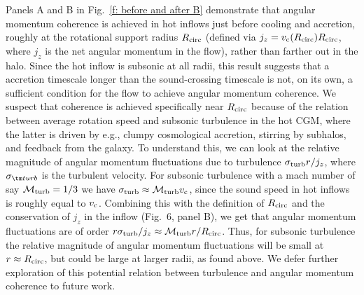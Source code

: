 \documentclass[fleqn,usenatbib]{mnras}
\newcommand{\Rcirc}[0]{R_{\rm circ}}
\newcommand{\vc}[0]{v_{\rm c}}
\newcommand{\mturb}[0]{\mathcal{M}_{\rm turb}}
\begin{document}
Panels A and B in Fig.~\ref{f: before and after B} demonstrate that angular momentum coherence is achieved in hot inflows just before cooling and accretion, roughly at the rotational support radius $\Rcirc$ (defined via $j_z=\vc(\Rcirc)\Rcirc$, where $j_z$ is the net angular momentum in the flow),  rather than farther out in the halo.
Since the hot inflow is subsonic at all radii, this result suggests that a accretion timescale longer than the sound-crossing timescale is not, on its own, a sufficient condition for the flow to achieve angular momentum coherence.
We suspect that coherence is achieved specifically near $\Rcirc$ because of the relation between average rotation speed and subsonic turbulence in the hot CGM, where the latter is driven by e.g., clumpy cosmological accretion, stirring by subhalos, and feedback from the galaxy.
To understand this, we can look at the relative magnitude of angular momentum fluctuations due to turbulence $\sigma_{\rm turb} r / j_z$, where $\sigma_{\tm turb}$ is the turbulent velocity.
For subsonic turbulence with a mach number of say $\mturb=1/3$ we have $\sigma_{\rm turb}\approx \mturb\vc$, since the sound speed in hot inflows is roughly equal to $\vc$.
Combining this with the definition of $\Rcirc$ and the conservation of $j_z$ in the inflow (Fig.~6, panel B), we get that angular momentum fluctuations are of order $r \sigma_{\rm turb}/j_z \approx \mturb r/ \Rcirc$.
Thus, for subsonic turbulence the relative magnitude of angular momentum fluctuations will be small at $r\approx\Rcirc$, but could be large at larger radii, as found above.
We defer further exploration of this potential relation between turbulence and angular momentum coherence to future work. 
\end{document}
